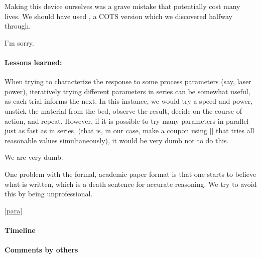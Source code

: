 \documentclass[paper.tex]{subfiles}
\begin{document}
Making this device ourselves was a grave mistake that potentially cost many lives. We should have used \cite{Straight}, a COTS version which we discovered halfway through. 

I'm sorry.

\paragraph{Lessons learned:}

When trying to characterize the response to some process parameters (say, laser power), iteratively trying different parameters in series can be somewhat useful, as each trial informs the next. In this instance, we would try a speed and power, unstick the material from the bed, observe the result, decide on the course of action, and repeat. However, if it is possible to try many parameters in parallel just as fast as in series, (that is, in our case, make a coupon using [] that tries all reasonable values simultaneously), it would be very dumb not to do this.

We are very dumb.

\printbibliography[title={General fluidics resources}, keyword={microfluidics}]

\printbibliography[title={Centrifugal}, keyword={centrifugal}]



One problem with the formal, academic paper format is that one starts to believe what is written, which is a death sentence for accurate reasoning. We try to avoid this by being unprofessional.

\label{para}
\ref{para}

\paragraph{Timeline}

\paragraph{Comments by others}



\end{document}
